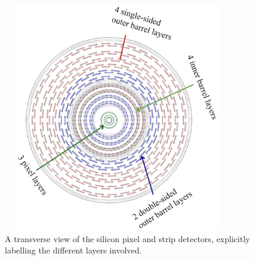 \begin{figure}[pbth]
\centering
\includegraphics[width=10cm,height=10cm,keepaspectratio]{figures/cms/tracker/silicon_tracker_transverse_view.png}
    \caption{A transverse view of the silicon pixel and strip detectors, explicitly labelling the different layers involved.}
    \label{fig:tracker_xs}
\end{figure}


